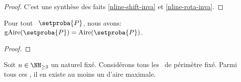 \begin{proof}
	C'est une synthèse des faits \ref{nline-shift-inva} et \ref{nline-rota-inva}.
\end{proof}
	
	


\begin{fact}
	Pour tout \ngone\ $\setproba{P}$, nous avons: $\garea{\setproba{P}} = \area{\setproba{P}}$.
\end{fact}


\begin{proof}
\end{proof}




\begin{fact} \label{suff-cond}
	Soit $n \in \NN_{\geq3}$ un naturel fixé.
	Considérons tous les \ngones\ de périmètre fixé. Parmi tous ces \ngones, il en existe au moins un d'aire maximale.
\end{fact}


